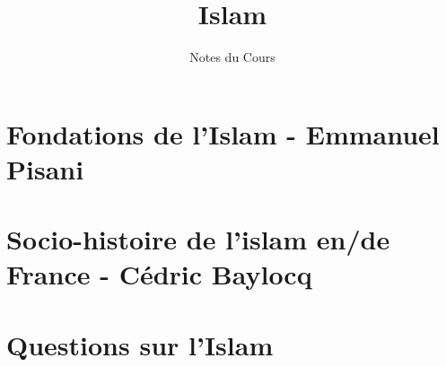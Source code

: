 \documentclass[oneside,10pt]{book} %
\title{Islam}
\author{Notes du Cours}
\begin{document}


\maketitle



\setcounter{page}{1}
\begin{fullwidth}
\tableofcontents
\end{fullwidth}

\setcounter{page}{1}

\mainmatter

%
\part{Fondations de l'Islam - Emmanuel Pisani}

\FloatBarrier






\part{Socio-histoire de l’islam en/de France - Cédric Baylocq}








\part{Questions sur l'Islam}







\backmatter

%
%
\printbibliography

\listoftheorems[ignoreall,show={Def}]

\end{document}
